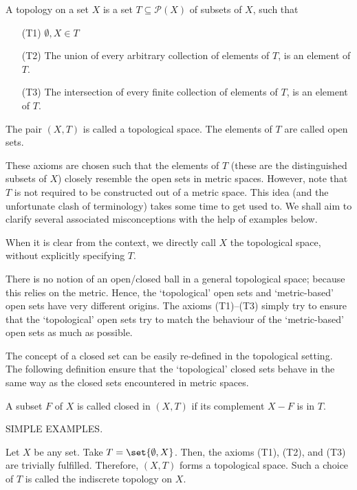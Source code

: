 \documentclass[draft]{penrose}
\begin{document}
\begin{ndfn}
  A topology on a set $X$ is a set $T \subseteq \mathcal{P}(X)$ of subsets of $X$, such that
  \begin{enumerate}
  \item[(T1)] $\emptyset, X \in T$
  \item[(T2)] The union of every arbitrary collection of elements of $T$, is an element of $T$.
  \item[(T3)] The intersection of every finite collection of elements of $T$, is an element of $T$.
  \end{enumerate}
  The pair $(X,T)$ is called a topological space. The elements of $T$ are called open sets.
\end{ndfn}

These axioms are chosen such that the elements of $T$ (these are the distinguished subsets of $X$) closely resemble the open sets in metric spaces. However, note that $T$ is not required to be constructed out of a metric space. This idea (and the unfortunate clash of terminology) takes some time to get used to. We shall aim to clarify several associated misconceptions with the help of examples below.

\begin{remark}
  When it is clear from the context, we directly call $X$ the topological space, without explicitly specifying $T$.
\end{remark}

\begin{remark}
  There is no notion of an open/closed ball in a general topological space; because this relies on the metric. Hence, the `topological' open sets and `metric-based' open sets have very different origins. The axioms (T1)--(T3) simply try to ensure that the `topological' open sets try to match the behaviour of the `metric-based' open sets as much as possible.
\end{remark}

The concept of a closed set can be easily re-defined in the topological setting. The following definition ensure that the `topological' closed sets behave in the same way as the closed sets encountered in metric spaces.
\begin{ndfn}
  A subset $F$ of $X$ is called closed in $(X,T)$ if its complement $X-F$ is in $T$.
\end{ndfn}

SIMPLE EXAMPLES.
\begin{negg}
  Let $X$ be any set. Take $T = \set{\emptyset, X}$. Then, the axioms (T1), (T2), and (T3) are trivially fulfilled. Therefore, $(X,T)$ forms a topological space. Such a choice of $T$ is called the indiscrete topology on $X$.
\end{negg}
\end{document}
